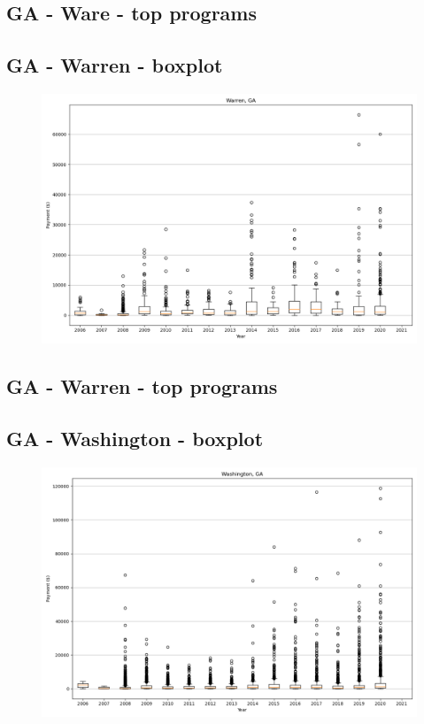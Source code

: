 \subsection*{GA - Ware - top programs}

\newpage
\subsection*{GA - Warren - boxplot}
\begin{figure}[h]
\centering
\includegraphics[width=7in]{../output/boxplots/counties/Warren-GA_boxplot.png}
\end{figure}


\subsection*{GA - Warren - top programs}

\newpage
\subsection*{GA - Washington - boxplot}
\begin{figure}[h]
\centering
\includegraphics[width=7in]{../output/boxplots/counties/Washington-GA_boxplot.png}
\end{figure}


